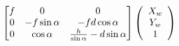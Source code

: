 \begin{questions}
\begin{parts}
\begin{subparts}
\begin{solution}
\[\begin{bmatrix}
        f & 0 & 0 \\
        0 & -f\sin \alpha & -fd \cos \alpha \\
        0 & \cos \alpha & \frac{h}{\sin \alpha} - d \sin \alpha \\
        \end{bmatrix}
        \left( \begin{array} {c} {X _ {w}} \\ {Y _ {w}} \\ {1} \\ \end{array} \right) \\
    \]

    \end{solution}
\end{subparts}


\end{parts}
\end{questions}